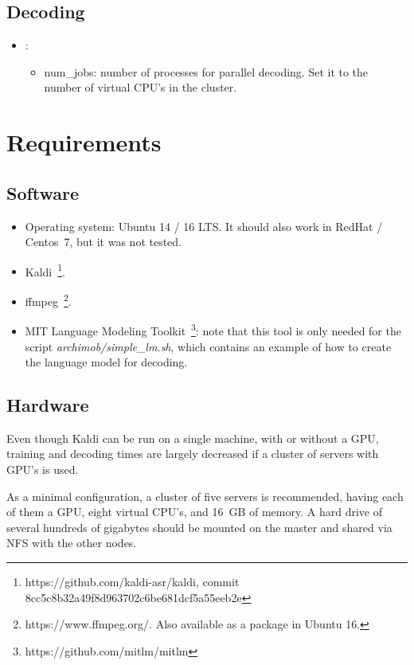 \documentclass[11pt,a4paper,titlepage,twoside]{article}
\begin{document}
\subsection{Decoding}
\label{sec:decoding}

\begin{itemize}
\item {}:
  \begin{itemize}
  \item num\_jobs: number of processes for parallel decoding. Set it to the number of virtual CPU's in the cluster.
  \end{itemize}
\end{itemize}

\section{Requirements}
\label{sec:requirements}

\subsection{Software}
\label{sec:software}

\begin{itemize}
\item Operating system: Ubuntu 14 / 16 LTS. It should also work in RedHat / Centos~7, but it was not tested.
\item Kaldi~\footnote{https://github.com/kaldi-asr/kaldi, commit 8cc5c8b32a49f8d963702c6be681dcf5a55eeb2e}.
\item ffmpeg~\footnote{https://www.ffmpeg.org/. Also available as a package in Ubuntu 16.}.
\item MIT Language Modeling Toolkit~\footnote{https://github.com/mitlm/mitlm}: note that this tool is only needed for the script \textit{archimob/simple\_lm.sh}, which contains an example of how to create the language model for decoding.
\end{itemize}

\subsection{Hardware}
\label{sec:hardware}

Even though Kaldi can be run on a single machine, with or without a GPU, training and decoding times are largely decreased if a cluster of servers with GPU's is used.

As a minimal configuration, a cluster of five servers is recommended, having each of them a GPU, eight virtual CPU's, and 16~GB of memory. A hard drive of several hundreds of gigabytes should be mounted on the master and shared via NFS with the other nodes.
\end{document}
